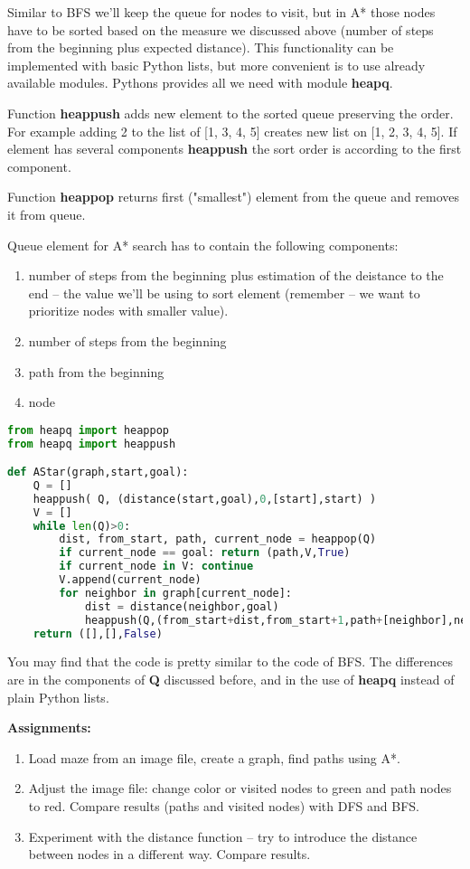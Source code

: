 Similar to BFS we'll keep the queue for nodes to visit, but in A*
those nodes have to be sorted based on the measure we discussed above
(number of steps from the beginning plus expected distance).
This functionality can be implemented with basic Python lists,
but more convenient is to use already available modules.
Pythons provides all we need with module \textbf{heapq}. 

Function \textbf{heappush} adds new element to the sorted queue 
preserving the order. For example adding 2 to the list of [1, 3, 4, 5]
creates new list on [1, 2, 3, 4, 5]. If element has several
components \textbf{heappush} the sort order is according to the
first component. 

Function \textbf{heappop} returns first ("smallest") element from
the queue and removes it from queue.

Queue element for A* search has to contain the following components:
\begin{enumerate}
\item number of steps from the beginning plus estimation of the deistance
to the end -- the value we'll be using to sort element (remember --
we want to prioritize nodes with smaller value).
\item number of steps from the beginning
\item path from the beginning
\item node
\end{enumerate}

\begin{lstlisting}[language=Python,style=codelst2,caption={Python: A* search}]
from heapq import heappop
from heapq import heappush

def AStar(graph,start,goal):
    Q = []
    heappush( Q, (distance(start,goal),0,[start],start) )
    V = []
    while len(Q)>0:
        dist, from_start, path, current_node = heappop(Q)
        if current_node == goal: return (path,V,True)
        if current_node in V: continue
        V.append(current_node)
        for neighbor in graph[current_node]:
            dist = distance(neighbor,goal)
            heappush(Q,(from_start+dist,from_start+1,path+[neighbor],neighbor))
    return ([],[],False)
\end{lstlisting}

You may find that the code is pretty similar to the code of BFS.
The differences are in the components of \textbf{Q} discussed before,
and in the use of \textbf{heapq} instead of plain Python lists.

\begin{tcolorbox}
\textbf{Assignments:}
\begin{enumerate}
\item Load maze from an image file, create a graph, find paths
using A*.
\item Adjust the image file: change color
or visited nodes to green and path nodes to red. Compare results 
(paths and visited nodes) with DFS and BFS.
\item Experiment with the distance function -- try to introduce
the distance between nodes in a different way. Compare results.
\end{enumerate}
\end{tcolorbox}


